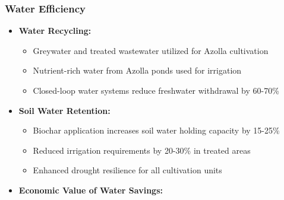 \subsubsection{Water Efficiency}
\begin{itemize}
    \item \textbf{Water Recycling:}
    \begin{itemize}
        \item Greywater and treated wastewater utilized for Azolla cultivation
        \item Nutrient-rich water from Azolla ponds used for irrigation
        \item Closed-loop water systems reduce freshwater withdrawal by 60-70\%
    \end{itemize}
    
    \item \textbf{Soil Water Retention:}
    \begin{itemize}
        \item Biochar application increases soil water holding capacity by 15-25\%
        \item Reduced irrigation requirements by 20-30\% in treated areas
        \item Enhanced drought resilience for all cultivation units
    \end{itemize}
    
    \item \textbf{Economic Value of Water Savings:}
\end{itemize}


